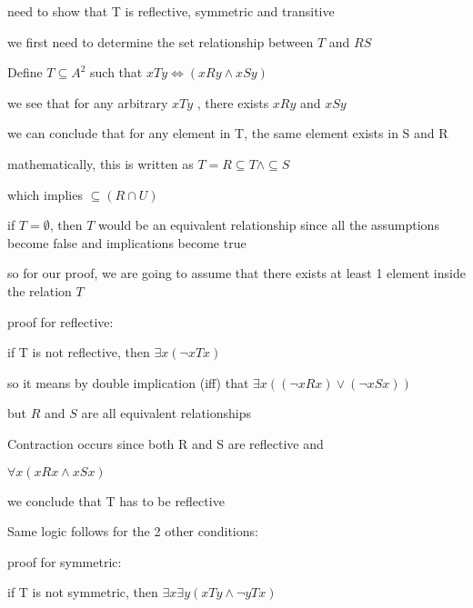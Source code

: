 \documentclass[12pts,A4]{article}
\begin{document}
\begin{flushleft}

    need to show that T is reflective, symmetric and transitive
    

    \bigskip
    \bigskip

    we first need to determine the set relationship between $T$ and $R S$
    
    Define $T \subseteq A^{2}$ such that $xTy \iff (xRy \wedge xSy)$

    we see that for any arbitrary $xTy$ , there exists $xRy$ and $xSy$

    we can conclude that for any element in T, the same element exists in S and R

    mathematically, this is written as $T = R \subseteq T \wedge \subseteq S$
    
    which implies $\subseteq ( R \cap U)$ 
    \bigskip
    

    

    if $ T = \emptyset $, then $T$ would be an equivalent relationship since all the assumptions become false and implications become true
    
    so for our proof, we are going to assume that there exists at least 1 element inside the relation $T$

    
    \bigskip

    proof for reflective:
    
    \bigskip

    if T is not reflective, then $ \exists x   (\neg x T x) $

    so it means by double implication (iff) that $ \exists x( (\neg xRx)
    \vee (\neg xSx)) $

    

    but $R$ and $S$ are all equivalent relationships 

    Contraction occurs since both R and S are reflective and 

    $\forall x( xRx \wedge xSx)$

    we conclude that T has to be reflective

    \bigskip


    Same logic follows for the 2 other conditions:

    \bigskip

    proof for symmetric:
    
    \bigskip

    if T is not symmetric, then $ \exists x \exists y  ( xTy \wedge \neg y T x) $


\end{flushleft}
\end{document}
